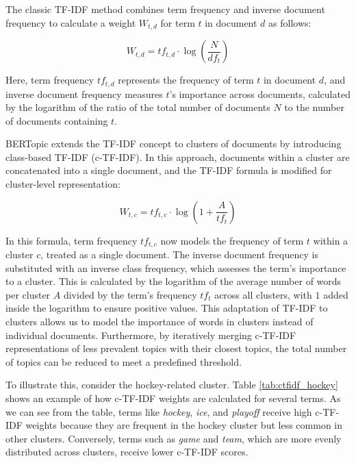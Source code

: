 The classic TF-IDF \cite{joachims_probabilistic_1997} method combines term frequency and inverse document frequency to calculate a weight $W_{t,d}$ for term $t$ in document $d$ as follows:

\[ W_{t,d} = tf_{t,d} \cdot \log\left(\frac{N}{df_t}\right) \]

Here, term frequency $tf_{t,d}$ represents the frequency of term $t$ in document $d$, and inverse document frequency measures $t$'s importance across documents, calculated by the logarithm of the ratio of the total number of documents $N$ to the number of documents containing $t$.


BERTopic extends the TF-IDF concept to clusters of documents by introducing class-based TF-IDF (c-TF-IDF). In this approach, documents within a cluster are concatenated into a single document, and the TF-IDF formula is modified for cluster-level representation:

\[ W_{t,c} = tf_{t,c} \cdot \log\left(1 + \frac{A}{tf_t}\right) \]

In this formula, term frequency $tf_{t,c}$ now models the frequency of term $t$ within a cluster $c$, treated as a single document. The inverse document frequency is substituted with an inverse class frequency, which assesses the term's importance to a cluster. This is calculated by the logarithm of the average number of words per cluster $A$ divided by the term's frequency $tf_t$ across all clusters, with $1$ added inside the logarithm to ensure positive values. This adaptation of TF-IDF to clusters allows us to model the importance of words in clusters instead of individual documents. Furthermore, by iteratively merging c-TF-IDF representations of less prevalent topics with their closest topics, the total number of topics can be reduced to meet a predefined threshold.

To illustrate this, consider the hockey-related cluster. Table \ref{tab:ctfidf_hockey} shows an example of how c-TF-IDF weights are calculated for several terms. As we can see from the table, terms like \textit{hockey}, \textit{ice}, and \textit{playoff} receive high c-TF-IDF weights because they are frequent in the hockey cluster but less common in other clusters. Conversely, terms such as \textit{game} and \textit{team}, which are more evenly distributed across clusters, receive lower c-TF-IDF scores.


